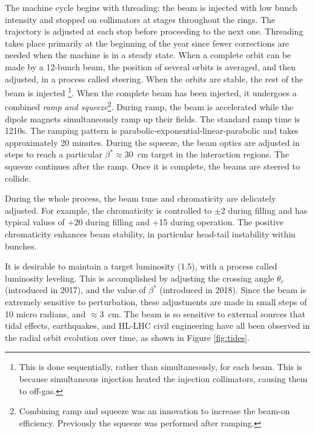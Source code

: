 The machine cycle begins with threading: the beam is injected with low bunch intensity and stopped on collimators at stages throughout the rings.
The trajectory is adjusted at each stop before proceeding to the next one.
Threading takes place primarily at the beginning of the year since fewer corrections are needed when the machine is in a steady state.
When a complete orbit can be made by a 12-bunch beam, the position of several orbits is averaged, and then adjusted, in a process called steering.
When the orbits are stable, the rest of the beam is injected \footnote{This is done sequentially, rather than simultaneously, for each beam. This is because simultaneous injection heated the injection collimators, causing them to off-gas.}.
When the complete beam has been injected, it undergoes a combined \emph{ramp and squeeze}\footnote{Combining ramp and squeeze was an innovation to increase the beam-on efficiency. Previously the squeeze was performed after ramping.}.
During ramp, the beam is accelerated while the dipole magnets simultaneously ramp up their fields.
The standard ramp time is 1210s. 
The ramping pattern is parabolic-exponential-linear-parabolic and takes approximately 20 minutes. 
During the squeeze, the beam optics are adjusted in steps to reach a particular $\beta^*\approx30$~cm target in the interaction regions.
The squeeze continues after the ramp.
Once it is complete, the beams are steered to collide.

During the whole process, the beam tune and chromaticity are delicately adjusted.
For example, the chromaticity is controlled to $\pm$2 during filling and has typical values of +20 during filling and +15 during operation. \cite{lhcRun2}
The positive chromaticity enhances beam stability, in particular head-tail instability within bunches.

It is desirable to maintain a target luminosity (1.5\cms), with a process called luminosity leveling.
This is accomplished by adjusting the crossing angle $\theta_c$ (introduced in 2017), and the value of $\beta^*$ (introduced in 2018).
Since the beam is extremely sensitive to perturbation, these adjustments are made in small steps of 10 micro radians, and $\approx3$~cm.
The beam is so sensitive to external sources that tidal effects, earthquakes, and HL-LHC civil engineering have all been observed in the radial orbit evolution over time, as shown in Figure \ref{fig:tides}.

